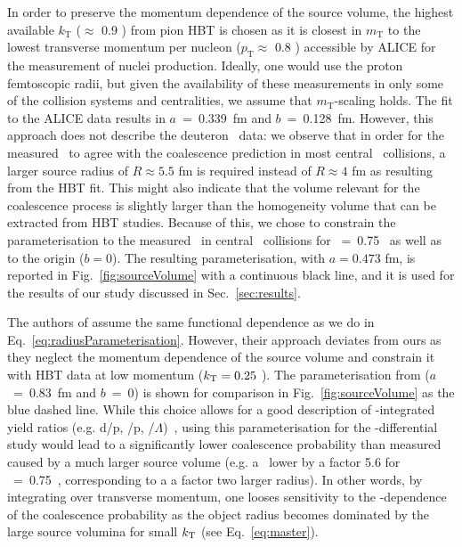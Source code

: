 \documentclass[%
 reprint,
 amsmath,amssymb,
 aps,
]{revtex4-1}
\begin{document}
%
In order to preserve the momentum dependence of the source volume, the highest available $k_{\mathrm{T}}$ ($\approx$ 0.9 \GeVc) from pion HBT is chosen as it is closest in $m_{\mathrm{T}}$ to the lowest transverse momentum per nucleon ($p_{\mathrm{T}} \approx$ 0.8 \GeVc) accessible by ALICE for the measurement of nuclei production. 
Ideally, one would use the proton femtoscopic radii, but given the availability of these measurements in only some of the collision systems and centralities, we assume that $m_{\mathrm{T}}$-scaling holds.
The fit to the ALICE data results in $a$~=~0.339~fm and $b$~=~0.128~fm.
However, this approach does not describe the deuteron \btwo~data: we observe that in order for the measured \btwo~to agree with the coalescence prediction in most central \PbPb~collisions, a larger source radius of $R \approx 5.5$ fm is required instead of $R \approx 4$ fm as resulting from the HBT fit.
This might also indicate that the volume relevant for the coalescence process is slightly larger than the homogeneity volume that can be extracted from HBT studies.
Because of this, we chose to constrain the parameterisation to the measured \btwo~in central \PbPb~collisions for \pt~=~0.75 \GeVc~as well as to the origin ($b = 0$). 
The resulting parameterisation, with $a = 0.473$ fm, is reported in Fig.~\ref{fig:sourceVolume} with a continuous black line, and it is used for the results of our study discussed in Sec.~\ref{sec:results}.


The authors of \cite{Sun:2018mqq} assume the same functional dependence as we do in Eq.~\ref{eq:radiusParameterisation}. 
However, their approach deviates from ours as they neglect the momentum dependence of the source volume and constrain it with HBT data at low momentum ($k_{\rm T} = 0.25$ \GeVc). 
The parameterisation from \cite{Sun:2018mqq} ($a$~=~0.83~fm and $b$~=~0) is shown for comparison in Fig.~\ref{fig:sourceVolume} as the blue dashed line.
While this choice allows for a good description of \pt-integrated yield ratios (e.g. d/p, \hethree/p, \hthreelambda/$\Lambda$)~\cite{Sun:2018mqq}, using this parameterisation for the \pt-differential study would lead to a significantly lower coalescence probability than measured caused by a much larger source volume (e.g. a \btwo~lower by a factor 5.6 for \pt~=~0.75~\GeVc, corresponding to a a factor two larger radius). 
In other words, by integrating over transverse momentum, one looses sensitivity to the \pt-dependence of the coalescence probability as the object radius becomes dominated by the large source volumina for small $k_{\rm T}$ (see Eq.~\ref{eq:master}).
\end{document}
